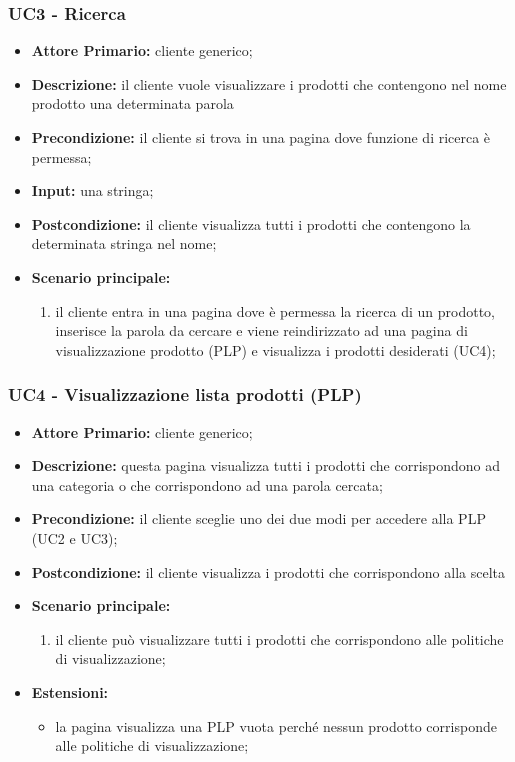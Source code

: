 \subsubsection{UC3 - Ricerca}
\begin{itemize}
    \item \textbf{Attore Primario:} cliente generico;
    \item \textbf{Descrizione:} il cliente vuole visualizzare i prodotti che contengono nel nome prodotto una determinata parola
    \item \textbf{Precondizione:} il cliente si trova in una pagina dove funzione di ricerca è permessa;
    \item \textbf{Input:} una stringa;
    \item \textbf{Postcondizione:} il cliente visualizza tutti i prodotti che contengono la determinata stringa nel nome;
    \item \textbf{Scenario principale:}
    \begin{enumerate}
        \item il cliente entra in una pagina dove è permessa la ricerca di un prodotto, inserisce la parola da cercare e viene reindirizzato ad una pagina di visualizzazione prodotto (PLP) e visualizza i prodotti desiderati (UC4);
    \end{enumerate}
\end{itemize}

\subsubsection{UC4 - Visualizzazione lista prodotti (PLP)}
\begin{itemize}
    \item \textbf{Attore Primario:} cliente generico;
    \item \textbf{Descrizione:} questa pagina visualizza tutti i prodotti che corrispondono ad una categoria o che corrispondono ad una parola cercata;
    \item \textbf{Precondizione:} il cliente sceglie uno dei due modi per accedere alla PLP (UC2 e UC3);
    \item \textbf{Postcondizione:} il cliente visualizza i prodotti che corrispondono alla scelta
    \item \textbf{Scenario principale:}
    \begin{enumerate}
        \item il cliente può visualizzare tutti i prodotti che corrispondono alle politiche di visualizzazione;
    \end{enumerate}
    \item \textbf{Estensioni:}
    \begin{itemize}
        \item la pagina visualizza una PLP vuota perché nessun prodotto corrisponde alle politiche di visualizzazione;
    \end{itemize}
\end{itemize}


